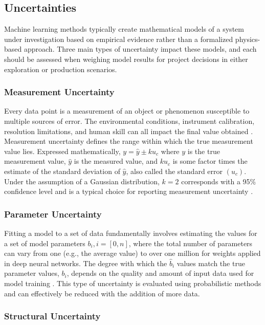 \subsection{Uncertainties}

Machine learning methods typically create mathematical models of a system under investigation based on empirical evidence rather than a formalized physics-based approach. Three main types of uncertainty impact these models, and each should be assessed when weighing model results for project decisions in either exploration or production scenarios. 

\subsubsection{Measurement Uncertainty}

Every data point is a measurement of an object or phenomenon susceptible to multiple sources of error. The environmental conditions, instrument calibration, resolution limitations, and human skill can all impact the final value obtained \citep[p.\ 11-14]{baird_experimentation_1962}. Measurement uncertainty defines the range within which the true measurement value lies. Expressed mathematically, $y=\hat{y} \pm ku_c$ where $y$ is the true measurement value, $\hat{y}$ is the measured value, and $ku_c$ is some factor times the estimate of the standard deviation of $\hat{y}$, also called the standard error $(u_c)$. Under the assumption of a Gaussian distribution, $k=2$  corresponds with a 95\% confidence level and is a typical choice for reporting measurement uncertainty \citep{nist_nist_2021}.

\subsubsection{Parameter Uncertainty}

Fitting a model to a set of data fundamentally involves estimating the values for a set of model parameters $b_i, i = [0, n]$, where the total number of parameters can vary from one (e.g., the average value) to over one million for weights applied in deep neural networks. The degree with which the $\hat{b}_i$ values match the true parameter values, $b_i$, depends on the quality and amount of input data used for model training \citep[p.\ 81]{james_introduction_2013}. This type of uncertainty is evaluated using probabilistic methods and can effectively be reduced with the addition of more data. 

\subsubsection{Structural Uncertainty}


